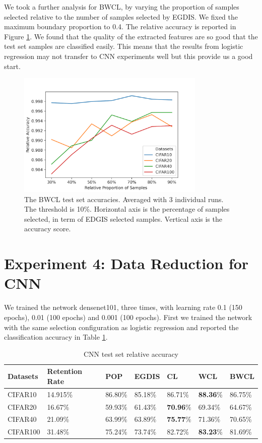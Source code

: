 We took a further analysis for BWCL, by varying the proportion of samples selected relative to the number of samples selected by EGDIS. We fixed the maximum boundary proportion to 0.4. The relative accuracy is reported in Figure \ref{Fig.logistic_subsets}. We found that the quality of the extracted features are so good that the test set samples are classified easily. This means that the results from logistic regression may not transfer to CNN experiments well but this provide us a good start.

\begin{figure}[H]
 \centering
 \includegraphics[width=0.8\textwidth]{src/bwcl_relative_size04.png}
 \caption{The BWCL test set accuracies. Averaged with 3 individual runs. The threshold is 10\%. Horizontal axis is the percentage of samples selected, in term of EDGIS selected samples. Vertical axis is the accuracy score.}
 \label{Fig.logistic_subsets}
 \end{figure}

\section{Experiment 4: Data Reduction for CNN}
\label{CNN}
We trained the network densenet101, three times, with learning rate 0.1 (150 epochs), 0.01 (100 epochs) and 0.001 (100 epochs). First we trained the network with the same selection configuration as logistic regression and reported the classification accuracy in Table \ref{CNN_accs}. 

\begin{table}[H]
    \centering
    \begin{tabular}{|l|l|l|l|l|l|l|}
    \hline
        Datasets & Retention Rate  & POP & EGDIS & CL & WCL & BWCL \\ \hline
        CIFAR10 & 14.915\% & 86.80\% & 85.18\% & 86.71\% &\textbf{88.36}\% & 86.75\% \\ \hline
        CIFAR20 & 16.67\% & 59.93\% & 61.43\% & \textbf{70.96}\% & 69.34\% & 64.67\% \\ \hline
        CIFAR40 & 21.09\% & 63.99\% & 63.89\% & \textbf{75.77}\% & 71.36\% & 70.65\% \\ \hline
        CIFAR100 & 31.48\% & 75.24\% & 73.74\% & 82.72\% & \textbf{83.23}\% & 81.69\% \\ \hline
    \end{tabular}
    \caption{CNN test set relative accuracy}
    \label{CNN_accs}
\end{table}

